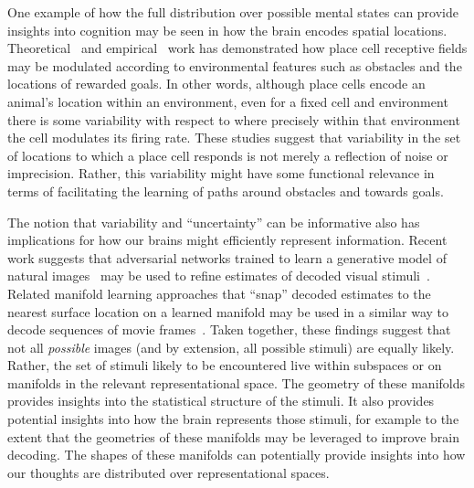 \documentclass{article}
\begin{document}
One example of how the full distribution over possible mental states can provide insights into cognition may be seen in how the brain encodes spatial locations.  Theoretical~\citep[e.g., ][]{GersAbbo97} and empirical~\citep[e.g., ][]{PfeiFost13} work has demonstrated how place cell receptive fields may be modulated according to environmental features such as obstacles and the locations of rewarded goals.  In other words, although place cells encode an animal's location within an environment, even for a fixed cell and environment there is some variability with respect to where precisely within that environment the cell modulates its firing rate.  These studies suggest that variability in the set of locations to which a place cell responds is not merely a reflection of noise or imprecision.  Rather, this variability might have some functional relevance in terms of facilitating the learning of paths around obstacles and towards goals.

The notion that variability and ``uncertainty'' can be informative also has implications for how our brains might efficiently represent information.  Recent work suggests that adversarial networks trained to learn a generative model of natural images~\citep[e.g., ][]{GatyEtal16, IsolEtal17} may be used to refine estimates of decoded visual stimuli~\citep{StYvNase18}. Related manifold learning approaches that ``snap'' decoded estimates to the nearest surface location on a learned manifold may be used in a similar way to decode sequences of movie frames~\citep{HeusEtal18a}.  Taken together, these findings suggest that not all \textit{possible} images (and by extension, all possible stimuli) are equally likely.  Rather, the set of stimuli likely to be encountered live within subspaces or on manifolds in the relevant representational space.  The geometry of these manifolds provides insights into the statistical structure of the stimuli.  It also provides potential insights into how the brain represents those stimuli, for example to the extent that the geometries of these manifolds may be leveraged to improve brain decoding.  The shapes of these manifolds can potentially provide insights into how our thoughts are distributed over representational spaces.
\end{document}
